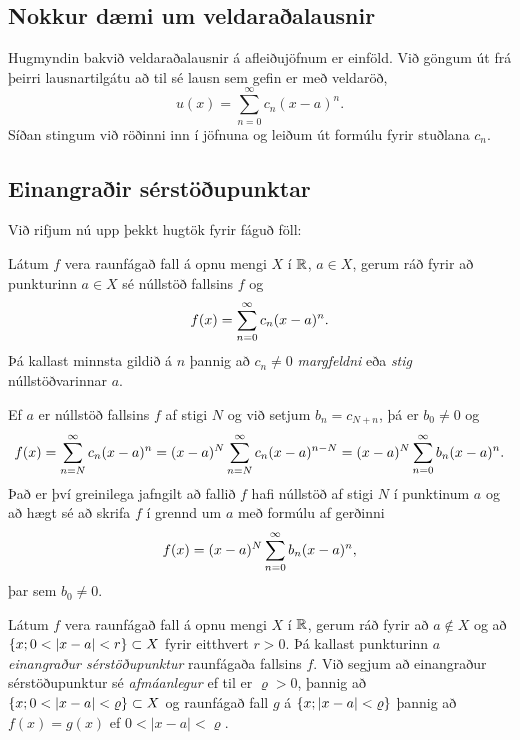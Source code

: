 \subsection*{Nokkur dæmi um veldaraðalausnir}

Hugmyndin bakvið veldaraðalausnir á afleiðujöfnum er einföld.  
Við göngum út frá þeirri lausnartilgátu að til sé lausn sem
gefin er með veldaröð,
$$
u(x)=\sum\limits_{n=0}^{\infty} c_n(x-a)^n.
$$
Síðan stingum við röðinni inn í jöfnuna og leiðum út formúlu fyrir
stuðlana $c_n$.  


\subsection*{Einangraðir sérstöðupunktar}

Við rifjum nú upp þekkt hugtök fyrir fáguð föll:

\begin{sk}
Látum $f$ vera raunfágað fall á opnu mengi $X$ í ${\mathbb R}$, $a\in X$, gerum ráð
fyrir að punkturinn  $a\in X$ sé núllstöð fallsins $f$ og 
$$ f(x)=\sum_{n=0}\sp \infty c_n(x-a)\sp n. $$
Þá kallast minnsta gildið á $n$ þannig að $c_n\neq 0$ {\it
margfeldni} eða
{\it stig}
núllstöðvarinnar
 $a$.
\end{sk}

Ef $a$ er núllstöð fallsins $f$ af stigi $N$ og við setjum
$b_n=c_{N+n}$, þá er $b_0\neq 0$ og
$$
f(x)=\sum_{n=N}\sp \infty c_n(x-a)\sp n=
(x-a)\sp N\sum_{n=N}\sp \infty c_n(x-a)\sp {n-N} =
(x-a)\sp N\sum_{n=0}\sp \infty b_n(x-a)\sp n.
$$
Það er því greinilega jafngilt að fallið $f$ hafi núllstöð af stigi
$N$ í punktinum $a$ og að hægt sé að skrifa $f$ í grennd um $a$ með
formúlu af gerðinni
$$ f(x)=(x-a)\sp N\sum_{n=0}\sp \infty b_n(x-a)\sp n, $$
þar sem $b_0\neq 0$.   

\begin{sk}
Látum $f$ vera raunfágað fall á opnu mengi  $X$ í ${\mathbb R}$, gerum ráð
fyrir að $a\not\in X$ og  að $\set{x; 0<|x-a|<r}\subset X$ fyrir
eitthvert $r>0$.  Þá kallast punkturinn $a$ {\it einangraður
sérstöðupunktur} 
raunfágaða fallsins $f$.  Við segjum að einangraður
sérstöðupunktur sé {\it afmáanlegur} ef til er $\varrho>0$, þannig að
$\set{x; 0<|x-a|<{\varrho}}\subset X$ og raunfágað fall
$g$ á ${\{x; |x-a|<{\varrho}\}}$ 
þannig að  $f(x)=g(x)$ ef $0<|x-a|<{\varrho}$.
\end{sk}


